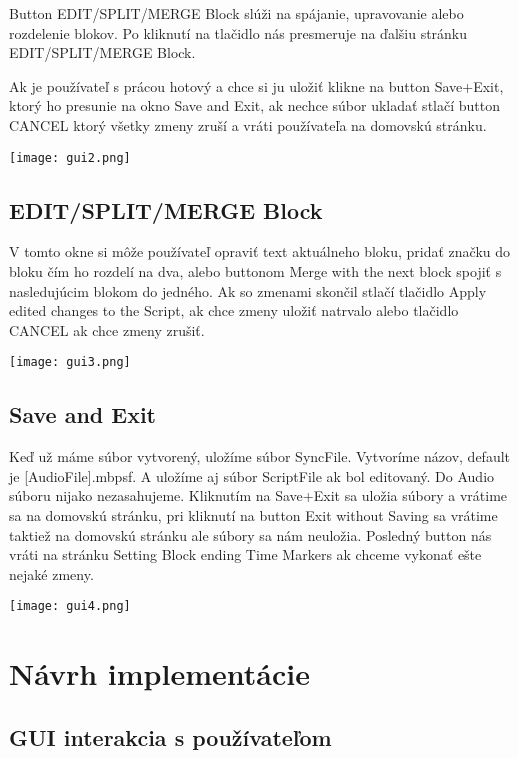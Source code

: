 \documentclass{article}
\begin{document}
Button EDIT/SPLIT/MERGE Block slúži na spájanie, upravovanie alebo rozdelenie blokov. Po kliknutí na tlačidlo nás presmeruje na ďalšiu stránku EDIT/SPLIT/MERGE Block.

Ak je používateľ s prácou hotový a chce si ju uložiť klikne na button Save+Exit, ktorý ho presunie na okno Save and Exit, ak nechce súbor ukladať stlačí button CANCEL ktorý všetky zmeny zruší a vráti používateľa na domovskú stránku.

\texttt{[image: gui2.png]}

\subsection{EDIT/SPLIT/MERGE Block}
V tomto okne si môže používateľ opraviť text aktuálneho bloku, pridať značku do bloku čím ho rozdelí na dva, alebo buttonom Merge with the next block spojiť s nasledujúcim blokom do jedného. Ak so zmenami skončil stlačí tlačidlo Apply edited changes to the Script, ak chce zmeny uložiť natrvalo alebo tlačidlo CANCEL ak chce zmeny zrušiť.

\texttt{[image: gui3.png]}

\subsection{Save and Exit}
Keď už máme súbor vytvorený, uložíme súbor SyncFile. Vytvoríme názov, default je [AudioFile].mbpsf. A uložíme aj súbor ScriptFile ak bol editovaný. Do Audio súboru nijako nezasahujeme. Kliknutím na Save+Exit sa uložia súbory a vrátime sa na domovskú stránku, pri kliknutí na button Exit without Saving sa vrátime taktiež na domovskú stránku ale súbory sa nám neuložia. Posledný button nás vráti na stránku Setting Block ending Time Markers ak chceme vykonať ešte nejaké zmeny.

\texttt{[image: gui4.png]}

\section{Návrh implementácie}

\subsection{GUI interakcia s používateľom}
\end{document}
